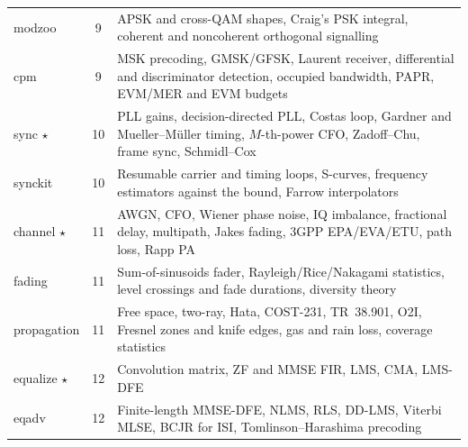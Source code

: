 \begin{table}[htbp]
\begin{tabularx}{\linewidth}{@{}>{\ttfamily}lc>{\raggedright\arraybackslash}X@{}}
modzoo & 9 & APSK and cross-QAM shapes, Craig's PSK integral, coherent and noncoherent orthogonal signalling\\
cpm & 9 & MSK precoding, GMSK/GFSK, Laurent receiver, differential and discriminator detection, occupied bandwidth, PAPR, EVM/MER and EVM budgets\\
sync $\star$ & 10 & PLL gains, decision-directed PLL, Costas loop, Gardner and Mueller--M\"uller timing, $M$-th-power CFO, Zadoff--Chu, frame sync, Schmidl--Cox\\
synckit & 10 & Resumable carrier and timing loops, S-curves, frequency estimators against the bound, Farrow interpolators\\
channel $\star$ & 11 & AWGN, CFO, Wiener phase noise, IQ imbalance, fractional delay, multipath, Jakes fading, 3GPP EPA/EVA/ETU, path loss, Rapp PA\\
fading & 11 & Sum-of-sinusoids fader, Rayleigh/Rice/Nakagami statistics, level crossings and fade durations, diversity theory\\
propagation & 11 & Free space, two-ray, Hata, COST-231, TR~38.901, O2I, Fresnel zones and knife edges, gas and rain loss, coverage statistics\\
equalize $\star$ & 12 & Convolution matrix, ZF and MMSE FIR, LMS, CMA, LMS-DFE\\
eqadv & 12 & Finite-length MMSE-DFE, NLMS, RLS, DD-LMS, Viterbi MLSE, BCJR for ISI, Tomlinson--Harashima precoding\\
\bottomrule
\end{tabularx}
\end{table}

